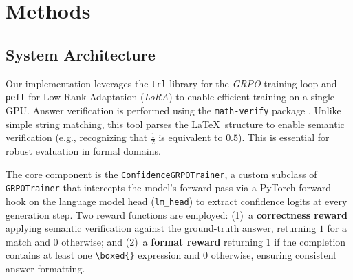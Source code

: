 \documentclass[a4paper,oneside,10pt,ngerman,english]{scrartcl}
\begin{document}
\section{Methods}
\label{sec:methods}

\subsection{System Architecture}
\label{sec:architecture}
Our implementation leverages the \texttt{trl} library \citep{trl} for the \textit{GRPO} training loop and \texttt{peft} \citep{peft} for Low-Rank Adaptation (\textit{LoRA}) \citep{lora} to enable efficient training on a single GPU. Answer verification is performed using the \texttt{math-verify} package \citep{mathverify}. Unlike simple string matching, this tool parses the \LaTeX ~structure to enable semantic verification (e.g., recognizing that $\frac{1}{2}$ is equivalent to $0.5$). This is essential for robust evaluation in formal domains.

The core component is the \texttt{ConfidenceGRPOTrainer}, a custom subclass of \texttt{GRPOTrainer} that intercepts the model's forward pass via a PyTorch \citep{pytorch} forward hook on the language model head (\texttt{lm\_head}) to extract confidence logits at every generation step. Two reward functions are employed: (1)~a \textbf{correctness reward} applying semantic verification against the ground-truth answer, returning $1$ for a match and $0$ otherwise; and (2)~a \textbf{format reward} returning $1$ if the completion contains at least one \texttt{\textbackslash boxed\{\}} expression and $0$ otherwise, ensuring consistent answer formatting.
\end{document}
